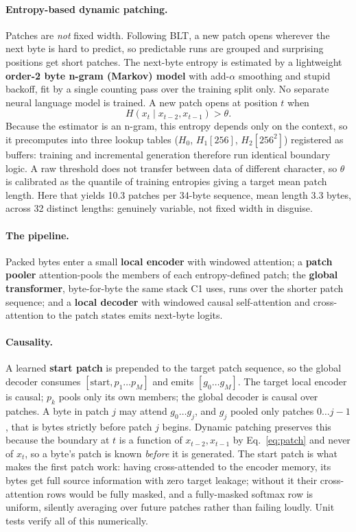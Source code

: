 \documentclass[12pt,a4paper]{article}
\begin{document}
\paragraph{Entropy-based dynamic patching.} Patches are \emph{not} fixed width.
Following BLT, a new patch opens wherever the next byte is hard to predict, so
predictable runs are grouped and surprising positions get short patches. The
next-byte entropy is estimated by a lightweight \textbf{order-2 byte n-gram
(Markov) model} with add-$\alpha$ smoothing and stupid backoff, fit by a single
counting pass over the training split only. No separate neural language model is
trained. A new patch opens at position $t$ when
\begin{equation}
H\!\left(x_t \mid x_{t-2}, x_{t-1}\right) > \theta .
\label{eq:patch}
\end{equation}
Because the estimator is an n-gram, this entropy depends only on the context, so
it precomputes into three lookup tables ($H_0$, $H_1[256]$, $H_2[256^2]$)
registered as buffers: training and incremental generation therefore run
identical boundary logic. A raw threshold does not transfer between data of
different character, so $\theta$ is calibrated as the quantile of training
entropies giving a target mean patch length. Here that yields 10.3 patches per
34-byte sequence, mean length 3.3 bytes, across 32 distinct lengths: genuinely
variable, not fixed width in disguise.

\paragraph{The pipeline.} Packed bytes enter a small \textbf{local encoder} with
windowed attention; a \textbf{patch pooler} attention-pools the members of each
entropy-defined patch; the \textbf{global transformer}, byte-for-byte the same
stack C1 uses, runs over the shorter patch sequence; and a \textbf{local decoder}
with windowed causal self-attention and cross-attention to the patch states emits
next-byte logits.

\paragraph{Causality.} A learned \textbf{start patch} is prepended to the target
patch sequence, so the global decoder consumes $[\text{start}, p_1 \ldots p_M]$
and emits $[g_0 \ldots g_M]$. The target local encoder is causal; $p_k$ pools
only its own members; the global decoder is causal over patches. A byte in patch
$j$ may attend $g_0 \ldots g_j$, and $g_j$ pooled only patches $0 \ldots j-1$,
that is bytes strictly before patch $j$ begins. Dynamic patching preserves this
because the boundary at $t$ is a function of $x_{t-2}, x_{t-1}$ by
Eq.~\ref{eq:patch} and never of $x_t$, so a byte's patch is known \emph{before}
it is generated. The start patch is what makes the first patch work: having
cross-attended to the encoder memory, its bytes get full source information with
zero target leakage; without it their cross-attention rows would be fully masked,
and a fully-masked softmax row is uniform, silently averaging over future patches
rather than failing loudly. Unit tests verify all of this numerically.
\end{document}
